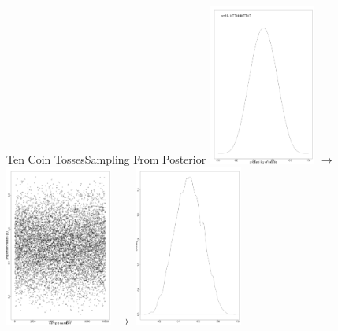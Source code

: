 \documentclass[dvipsnames,mathserif, handout]{beamer}
\begin{document}
{\begin{frame}{Ten Coin Tosses}{Sampling From Posterior}
	\includegraphics[valign=m, width=100pt]{cointosses/Ten.pdf} $\longrightarrow$
    	\includegraphics[valign=m, width=100pt]{cointosses/samples.pdf} $\longrightarrow$
    	\includegraphics[valign=m, width=100pt]{cointosses/sample_density.pdf}
\end{frame}
	

}
\end{document}
